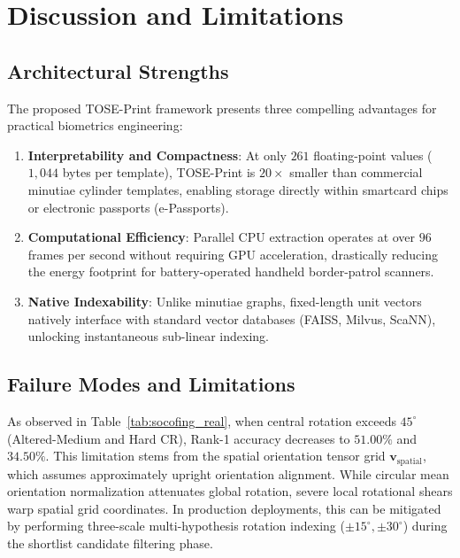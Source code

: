 \documentclass[lettersize,journal]{IEEEtran}
\begin{document}
\section{Discussion and Limitations}
\label{sec:discussion}

\subsection{Architectural Strengths}
The proposed TOSE-Print framework presents three compelling advantages for practical biometrics engineering:
\begin{enumerate}
    \item \textbf{Interpretability and Compactness}: At only $261$ floating-point values ($1,044$ bytes per template), TOSE-Print is $20\times$ smaller than commercial minutiae cylinder templates, enabling storage directly within smartcard chips or electronic passports (e-Passports).
    \item \textbf{Computational Efficiency}: Parallel CPU extraction operates at over $96$ frames per second without requiring GPU acceleration, drastically reducing the energy footprint for battery-operated handheld border-patrol scanners.
    \item \textbf{Native Indexability}: Unlike minutiae graphs, fixed-length unit vectors natively interface with standard vector databases (FAISS, Milvus, ScaNN), unlocking instantaneous sub-linear indexing.
\end{enumerate}

\subsection{Failure Modes and Limitations}
As observed in Table~\ref{tab:socofing_real}, when central rotation exceeds $45^\circ$ (Altered-Medium and Hard CR), Rank-1 accuracy decreases to $51.00\%$ and $34.50\%$. This limitation stems from the spatial orientation tensor grid $\mathbf{v}_{\text{spatial}}$, which assumes approximately upright orientation alignment. While circular mean orientation normalization attenuates global rotation, severe local rotational shears warp spatial grid coordinates. In production deployments, this can be mitigated by performing three-scale multi-hypothesis rotation indexing ($\pm 15^\circ, \pm 30^\circ$) during the shortlist candidate filtering phase.
\end{document}
